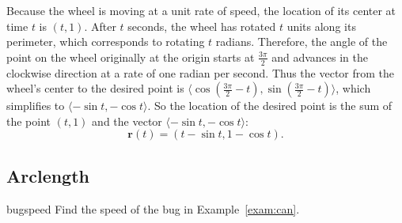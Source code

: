 \documentclass{watsonbook}
\begin{document}
\begin{solution}
  Because the wheel is moving at a unit rate of speed, the location of
  its center at time $t$ is $(t,1)$. After $t$ seconds, the wheel has
  rotated $t$ units along its perimeter, which corresponds to rotating
  $t$ radians. Therefore, the angle of the point on the wheel
  originally at the origin starts at $\tfrac{3\pi}{2}$ and advances in
  the clockwise direction at a rate of one radian per second. Thus the
  vector from the wheel's center to the desired point is
  $\langle \cos\left(\tfrac{3\pi}{2}-t\right),
  \sin\left(\tfrac{3\pi}{2}-t\right)\rangle$, which simplifies to
  $\langle -\sin t, - \cos t \rangle$. So the location of the
  desired point is the sum of the point $(t,1)$ and the vector
  $\langle -\sin t, - \cos t \rangle$:
  \[
    \boxed{\mathbf{r}(t) = (t - \sin t, 1- \cos t). }
  \]
\end{solution}

\subsection{Arclength} \label{subsec:arclength} 

\begin{example}{}{bugspeed}
  Find the speed of the bug in Example~\ref{exam:can}. 
\end{example}
\end{document}
